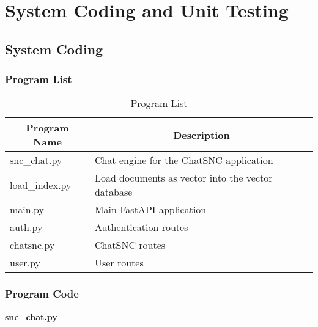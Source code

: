 

\chapter{System Coding and Unit Testing}

\section{System Coding}

\subsection{Program List}


\begin{table}[h!]
  \centering
  
  \begin{tabular}{|p{4cm}|p{8cm}|}
    \hline
    \multicolumn{1}{|c|}{\textbf{Program Name}} & \multicolumn{1}{c|}{\textbf{Description}}\\ \hline
    snc\_chat.py & Chat engine for the ChatSNC application\\ \hline
    load\_index.py & Load documents as vector into the vector database\\ \hline
    main.py & Main FastAPI application\\ \hline
    auth.py & Authentication routes\\ \hline
    chatsnc.py & ChatSNC routes\\ \hline
    user.py & User routes\\ \hline
  \end{tabular}
  \vspace*{8pt}

  \caption{Program List}
\end{table}

\subsection{Program Code}
  
\textbf{snc\_chat.py}

